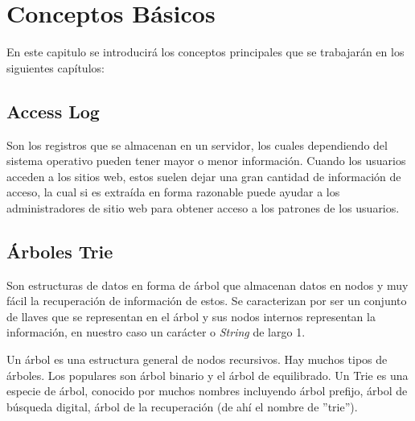 \chapter[Conceptos Básicos]{Conceptos Básicos}
\label{ch:Conceptos-Basicos}





En este capitulo se introducirá los conceptos principales que se trabajarán en los siguientes capítulos:




\section{Access Log}

Son los registros que se almacenan en un servidor, los cuales dependiendo del sistema operativo pueden tener mayor o menor información. Cuando los usuarios acceden a los sitios web, estos  suelen dejar una gran cantidad de información de acceso, la cual si es extraída en forma razonable puede ayudar a los administradores de sitio web para obtener acceso a los patrones de los usuarios. 


\section{Árboles Trie}



Son estructuras de datos en forma de árbol que almacenan datos en nodos y muy fácil la recuperación de información de estos. Se caracterizan por ser un conjunto de llaves que se representan en el árbol y sus nodos internos representan la información, en nuestro caso un carácter o \emph{String} de largo 1. 

Un árbol es una estructura general de nodos recursivos. Hay muchos tipos de árboles. Los populares son árbol binario y el árbol de equilibrado. Un Trie es una especie de árbol, conocido por muchos nombres incluyendo árbol prefijo, árbol de búsqueda digital, árbol de la recuperación (de ahí el nombre de ''trie'').

